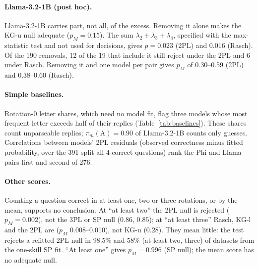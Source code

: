 \documentclass{article}
\theoremstyle{plain}
\theoremstyle{remark}
\begin{document}
\paragraph{Llama-3.2-1B (post hoc).} Llama-3.2-1B carries part, not all, of
the excess. Removing it alone makes the KG-u null
adequate ($p_M=0.15$). The sum $\lambda_2+\lambda_3+\lambda_4$, specified with
the max-statistic test and not used for decisions, gives $p=0.023$
(2PL) and $0.016$ (Rasch). Of the 190 removals, 12 of the 19 that include it still reject under the 2PL and 6 under Rasch. Removing it and one model per pair gives $p_M$ of 0.30--0.59 (2PL) and 0.38--0.60 (Rasch).

\paragraph{Simple baselines.} Rotation-0 letter shares, which need no model fit, flag three models whose most frequent letter
exceeds half of their replies (Table~\ref{tab:baselines}). These shares
count unparseable replies; $\pi_m(\mathrm{A})=0.90$ of Llama-3.2-1B
counts only guesses. Correlations between models' 2PL residuals
(observed correctness minus fitted probability, over the 391 split
all-4-correct questions) rank the Phi and Llama pairs first and second
of 276.

\paragraph{Other scores.} Counting a question correct in at least one,
two or three rotations, or by the mean, supports no conclusion. At ``at least two'' the 2PL null is rejected ($p_M=0.002$),
not the 3PL or SP null ($0.86$, $0.85$); at ``at least three'' Rasch,
KG-l and the 2PL are ($p_M$ 0.008--0.010), not KG-u ($0.28$). They mean little: the test rejects a
refitted 2PL null in 98.5\% and 58\% (at least two, three) of datasets
from the one-skill SP fit.
``At least one'' gives $p_M=0.996$ (SP null); the mean score has no
adequate null.
\end{document}
